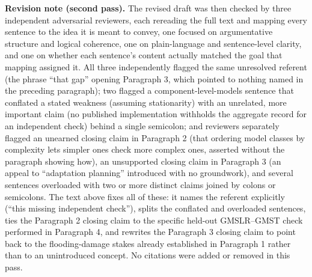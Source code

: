 \documentclass[12pt]{article}
\begin{document}
\noindent\textbf{Revision note (second pass).} The revised draft was then
checked by three independent adversarial reviewers, each rereading the
full text and mapping every sentence to the idea it is meant to convey,
one focused on argumentative structure and logical coherence, one on
plain-language and sentence-level clarity, and one on whether each
sentence's content actually matched the goal that mapping assigned it.
All three independently flagged the same unresolved referent (the phrase
``that gap'' opening Paragraph 3, which pointed to nothing named in the
preceding paragraph); two flagged a component-level-models sentence that
conflated a stated weakness (assuming stationarity) with an unrelated,
more important claim (no published implementation withholds the
aggregate record for an independent check) behind a single semicolon; and
reviewers separately flagged an unearned closing claim in Paragraph 2 (that
ordering model classes by complexity lets simpler ones check more complex
ones, asserted without the paragraph showing how), an unsupported closing
claim in Paragraph 3 (an appeal to ``adaptation planning'' introduced with
no groundwork), and several sentences overloaded with two or more distinct
claims joined by colons or semicolons. The text above fixes all of these:
it names the referent explicitly (``this missing independent check''),
splits the conflated and overloaded sentences, ties the Paragraph 2
closing claim to the specific held-out GMSLR--GMST check performed in
Paragraph 4, and rewrites the Paragraph 3 closing claim to point back to
the flooding-damage stakes already established in Paragraph 1 rather than
to an unintroduced concept. No citations were added or removed in this
pass.
\end{document}
